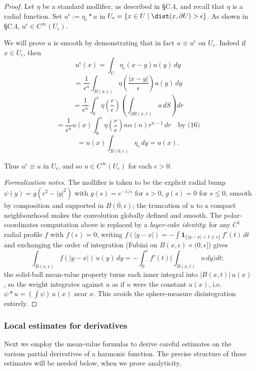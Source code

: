 \begin{proof}
\leanok
Let $\eta$ be a standard mollifier, as described in \S C.4, and recall that $\eta$ is a radial function. Set $u^\epsilon := \eta_\epsilon * u$ in $U_\epsilon = \{x \in U \mid \dist(x, \partial U) > \epsilon\}$. As shown in \S C.4, $u^\epsilon \in C^\infty(U_\epsilon)$.

We will prove $u$ is smooth by demonstrating that in fact $u \equiv u^\epsilon$ on $U_\epsilon$. Indeed if $x \in U_\epsilon$, then
$$u^\epsilon(x) = \int_U \eta_\epsilon(x-y)u(y) \, dy$$
$$= \frac{1}{\epsilon^n} \int_{B(x,\epsilon)} \eta\left(\frac{|x-y|}{\epsilon}\right) u(y) \, dy$$
$$= \frac{1}{\epsilon^n} \int_0^\epsilon \eta\left(\frac{r}{\epsilon}\right) \left(\int_{\partial B(x,r)} u \, dS\right) dr$$
$$= \frac{1}{\epsilon^n} u(x) \int_0^\epsilon \eta\left(\frac{r}{\epsilon}\right) n\alpha(n)r^{n-1} \, dr \quad \text{by (16)}$$
$$= u(x) \int_{B(0,\epsilon)} \eta_\epsilon \, dy = u(x).$$

Thus $u^\epsilon \equiv u$ in $U_\epsilon$, and so $u \in C^\infty(U_\epsilon)$ for each $\epsilon > 0$.

\emph{Formalization notes.} The mollifier is taken to be the explicit radial bump
$\psi(y) = g(\epsilon^2 - |y|^2)$ with $g(s) = e^{-1/s}$ for $s > 0$, $g(s) = 0$ for
$s \le 0$, smooth by composition and supported in $\overline{B(0,\epsilon)}$; the
truncation of $u$ to a compact neighbourhood makes the convolution globally defined and
smooth. The polar-coordinates computation above is replaced by a
\emph{layer-cake identity}: for any $C^1$ radial profile $f$ with $f(\epsilon) = 0$,
writing $f(|y-x|) = -\int \mathbf{1}_{\{|y-x| < t \le \epsilon\}}\, f'(t)\, dt$ and
exchanging the order of integration (Fubini on $B(x,\epsilon) \times (0,\epsilon]$)
gives
$$\int_{B(x,\epsilon)} f(|y-x|)\, u(y)\, dy
  = -\int_0^\epsilon f'(t) \Big( \int_{B(x,t)} u \, dy \Big) dt;$$
the solid-ball mean-value property turns each inner integral into
$|B(x,t)|\,u(x)$, so the weight integrates against $u$ as if $u$ were the constant
$u(x)$, i.e.\ $\psi * u = (\int \psi)\, u(x)$ near $x$. This avoids the sphere-measure
disintegration entirely.
\end{proof}

\subsubsection{Local estimates for derivatives}
\label{sec:laplace-local-estimates-derivatives}

Next we employ the mean-value formulas to derive careful estimates on the various partial derivatives of a harmonic function. The precise structure of these estimates will be needed below, when we prove analyticity.

